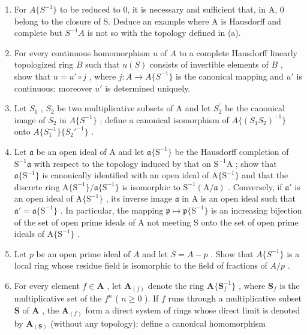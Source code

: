 \begin{enumerate}
\def\labelenumi{(\alph{enumi})}
\setcounter{enumi}{1}
\item
  For \(A\{S^{-1}\}\) to be reduced to 0, it is necessary and sufficient that, in A, 0 belong to the closure of S. Deduce an example where A is Hausdorff and complete but \(S^{-1}A\) is not so with the topology defined in (a).
\item
  For every continuous homomorphism \(u\) of \(A\) to a complete Hausdorff linearly topologized ring \(B\) such that \(u(S)\) consists of invertible elements of \(B\) , show that \(u = u' \circ j\) , where \(j: A \to A\{S^{-1}\}\) is the canonical mapping and \(u'\) is continuous; moreover \(u'\) is determined uniquely.
\item
  Let \(S_{1}\) , \(S_{2}\) be two multiplicative subsets of A and let \(S_{2}^{\prime}\) be the canonical image of \(S_{2}\) in \(A\{S^{-1}\}\) ; define a canonical isomorphism of \(A\{(S_{1}S_{2})^{-1}\}\) onto \(A\{S_{1}^{-1}\}\{S_{2}'^{-1}\}\) .
\item
  Let \(\mathfrak{a}\) be an open ideal of A and let \(\mathfrak{a}\{\mathrm{S}^{-1}\}\) be the Hausdorff completion of \(\mathrm{S}^{-1}\mathfrak{a}\) with respect to the topology induced by that on \(\mathrm{S}^{-1}\mathrm{A}\) ; show that \(\mathfrak{a}\{\mathrm{S}^{-1}\}\) is canonically identified with an open ideal of \(\mathrm{A}\{\mathrm{S}^{-1}\}\) and that the discrete ring \(\mathrm{A}\{\mathrm{S}^{-1}\} / \mathfrak{a}\{\mathrm{S}^{-1}\}\) is isomorphic to \(\mathrm{S}^{-1}(\mathrm{A} / \mathfrak{a})\) . Conversely, if \(\mathfrak{a}'\) is an open ideal of \(\mathrm{A}\{\mathrm{S}^{-1}\}\) , its inverse image \(\mathfrak{a}\) in A is an open ideal such that \(\mathfrak{a}' = \mathfrak{a}\{\mathrm{S}^{-1}\}\) . In particular, the mapping \(\mathfrak{p} \mapsto \mathfrak{p}\{\mathrm{S}^{-1}\}\) is an increasing bijection of the set of open prime ideals of A not meeting S onto the set of open prime ideals of \(\mathrm{A}\{\mathrm{S}^{-1}\}\) .
\item
  Let \(p\) be an open prime ideal of \(A\) and let \(S = A - p\) . Show that \(A\{S^{-1}\}\) is a local ring whose residue field is isomorphic to the field of fractions of \(A / p\) .
\item
  For every element \(f \in \mathbf{A}\) , let \(\mathbf{A}_{(f)}\) denote the ring \(\mathbf{A}\{\mathbf{S}_f^{-1}\}\) , where \(\mathbf{S}_f\) is the multiplicative set of the \(f^n\) ( \(n \geqslant 0\) ). If \(f\) runs through a multiplicative subset \(\mathbf{S}\) of \(\mathbf{A}\) , the \(\mathbf{A}_{(f)}\) form a direct system of rings whose direct limit is denoted by \(\mathbf{A}_{(\mathbf{S})}\) (without any topology); define a canonical homomorphism
\end{enumerate}

